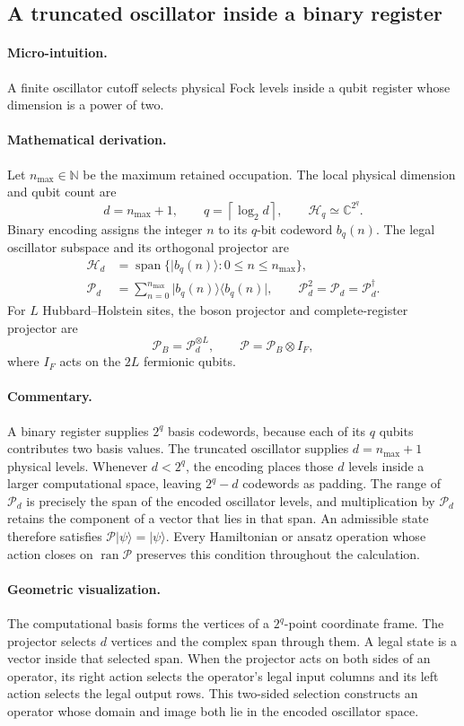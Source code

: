 \documentclass[10pt,twocolumn]{article}
\newcommand{\ket}[1]{\lvert #1\rangle}
\newcommand{\bra}[1]{\langle #1\rvert}
\newcommand{\C}{\mathbb C}
\newcommand{\Span}{\operatorname{span}}
\newcommand{\micro}{\paragraph{Micro-intuition.}}
\newcommand{\mathderiv}{\paragraph{Mathematical derivation.}}
\newcommand{\commentaryblock}{\paragraph{Commentary.}}
\newcommand{\geometryblock}{\paragraph{Geometric visualization.}}
\begin{document}
\subsection*{A truncated oscillator inside a binary register}

\micro A finite oscillator cutoff selects physical Fock levels inside a qubit
register whose dimension is a power of two.

\mathderiv Let \(n_{\max}\in\mathbb N\) be the maximum retained occupation.
The local physical dimension and qubit count are
\begin{equation}
d=n_{\max}+1,\qquad q=\left\lceil\log_2 d\right\rceil,\qquad
\mathcal H_q\simeq\C^{2^q}.
\label{eq:local-dimension}
\end{equation}
Binary encoding assigns the integer \(n\) to its \(q\)-bit codeword
\(b_q(n)\). The legal oscillator subspace and its orthogonal projector are
\begin{align}
\mathcal H_d
&=\Span\{\ket{b_q(n)}:0\leq n\leq n_{\max}\},\nonumber\\
\mathcal P_d
&=\sum_{n=0}^{n_{\max}}
\ket{b_q(n)}\bra{b_q(n)},\qquad
\mathcal P_d^2=\mathcal P_d=\mathcal P_d^\dagger.
\label{eq:legal-projector}
\end{align}
For \(L\) Hubbard--Holstein sites, the boson projector and complete-register
projector are
\begin{equation}
\mathcal P_B=\mathcal P_d^{\otimes L},\qquad
\mathcal P=\mathcal P_B\otimes I_F,
\label{eq:global-projector}
\end{equation}
where \(I_F\) acts on the \(2L\) fermionic qubits.

\commentaryblock A binary register supplies \(2^q\) basis codewords, because
each of its \(q\) qubits contributes two basis values. The truncated oscillator
supplies \(d=n_{\max}+1\) physical levels. Whenever \(d<2^q\), the encoding
places those \(d\) levels inside a larger computational space, leaving
\(2^q-d\) codewords as padding. The range of \(\mathcal P_d\) is precisely the
span of the encoded oscillator levels, and multiplication by \(\mathcal P_d\)
retains the component of a vector that lies in that span. An admissible state
therefore satisfies \(\mathcal P\ket\psi=\ket\psi\). Every Hamiltonian or
ansatz operation whose action closes on \(\operatorname{ran}\mathcal P\)
preserves this condition throughout the calculation.

\geometryblock The computational basis forms the vertices of a \(2^q\)-point
coordinate frame. The projector selects \(d\) vertices and the complex span
through them. A legal state is a vector inside that selected span. When the
projector acts on both sides of an operator, its right action selects the
operator's legal input columns and its left action selects the legal output
rows. This two-sided selection constructs an operator whose domain and image
both lie in the encoded oscillator space.
\end{document}
